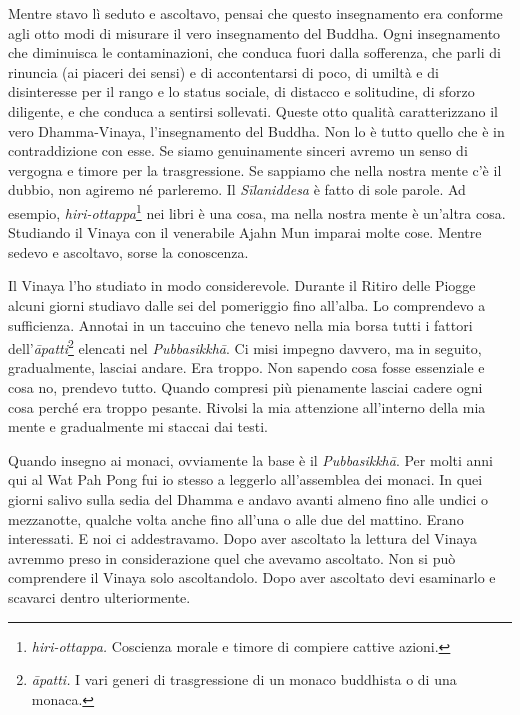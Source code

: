 Mentre stavo lì seduto e ascoltavo, pensai che questo insegnamento era
conforme agli otto modi di misurare il vero insegnamento del Buddha.
Ogni insegnamento che diminuisca le contaminazioni, che conduca fuori
dalla sofferenza, che parli di rinuncia (ai piaceri dei sensi) e di
accontentarsi di poco, di umiltà e di disinteresse per il rango e lo
status sociale, di distacco e solitudine, di sforzo diligente, e che
conduca a sentirsi sollevati. Queste otto qualità caratterizzano il vero
Dhamma-Vinaya, l'insegnamento del Buddha. Non lo è tutto quello che è in
contraddizione con esse. Se siamo genuinamente sinceri avremo un senso
di vergogna e timore per la trasgressione. Se sappiamo che nella nostra
mente c'è il dubbio, non agiremo né parleremo. Il \emph{Sīlaniddesa} è
fatto di sole parole. Ad esempio, \emph{hiri-ottappa}\footnote{\emph{hiri-ottappa.}
  Coscienza morale e timore di compiere cattive azioni.} nei libri è una
cosa, ma nella nostra mente è un'altra cosa. Studiando il Vinaya con il
venerabile Ajahn Mun imparai molte cose. Mentre sedevo e ascoltavo,
sorse la conoscenza.

Il Vinaya l'ho studiato in modo considerevole. Durante il Ritiro delle
Piogge alcuni giorni studiavo dalle sei del pomeriggio fino all'alba. Lo
comprendevo a sufficienza. Annotai in un taccuino che tenevo nella mia
borsa tutti i fattori dell'\emph{āpatti}\footnote{\emph{āpatti.} I vari
  generi di trasgressione di un monaco buddhista o di una monaca.}
elencati nel \emph{Pubbasikkhā}. Ci misi impegno davvero, ma in seguito,
gradualmente, lasciai andare. Era troppo. Non sapendo cosa fosse
essenziale e cosa no, prendevo tutto. Quando compresi più pienamente
lasciai cadere ogni cosa perché era troppo pesante. Rivolsi la mia
attenzione all'interno della mia mente e gradualmente mi staccai dai
testi.

Quando insegno ai monaci, ovviamente la base è il \emph{Pubbasikkhā}.
Per molti anni qui al Wat Pah Pong fui io stesso a leggerlo
all'assemblea dei monaci. In quei giorni salivo sulla sedia del Dhamma
e andavo avanti almeno fino alle undici o mezzanotte, qualche volta
anche fino all'una o alle due del mattino. Erano interessati. E noi ci
addestravamo. Dopo aver ascoltato la lettura del Vinaya avremmo preso in
considerazione quel che avevamo ascoltato. Non si può comprendere il
Vinaya solo ascoltandolo. Dopo aver ascoltato devi esaminarlo e scavarci
dentro ulteriormente.

